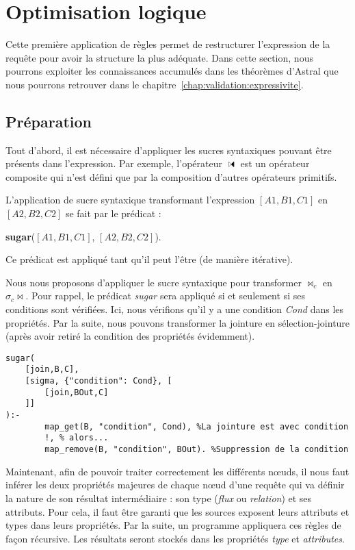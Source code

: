 \section{Optimisation logique}\label{sec:contrib:astronef:logique}
Cette première application de règles permet de restructurer l'expression de la requête pour avoir la structure la plus adéquate. Dans cette section, nous pourrons exploiter les connaissances accumulés dans les théorèmes d'Astral que nous pourrons retrouver dans le chapitre~\ref{chap:validation:expressivite}.
\subsection{Préparation}
Tout d'abord, il est nécessaire d'appliquer les sucres syntaxiques pouvant être présents dans l'expression. Par exemple, l'opérateur $\ssjoin$ est un opérateur composite qui n'est défini que par la composition d'autres opérateurs primitifs.

\begin{regle}
L'application de sucre syntaxique transformant l'expression $[A1,B1,C1]$ en $[A2,B2,C2]$ se fait par le prédicat :
\begin{center} \textbf{sugar}($[A1,B1,C1]$, $[A2,B2,C2]$).\end{center}
Ce prédicat est appliqué tant qu'il peut l'être (de manière itérative).
\end{regle}

\begin{example}
	Nous nous proposons d'appliquer le sucre syntaxique pour transformer $\Join_c$ en $\sigma_c \Join$. Pour rappel, le prédicat \textit{sugar} sera appliqué si et seulement si ses conditions sont vérifiées. Ici, nous vérifions qu'il y a une condition \textit{Cond} dans les propriétés. Par la suite, nous pouvons transformer la jointure en sélection-jointure (après avoir retiré la condition des propriétés évidemment).
	\begin{lstlisting}
sugar(
	[join,B,C], 
	[sigma, {"condition": Cond}, [
		[join,BOut,C]
	]]
):-
    	map_get(B, "condition", Cond), %La jointure est avec condition
    	!, % alors...
    	map_remove(B, "condition", BOut). %Suppression de la condition
	\end{lstlisting}
\end{example}

Maintenant, afin de pouvoir traiter correctement les différents nœuds, il nous faut inférer les deux propriétés majeures de chaque nœud d'une requête qui va définir la nature de son résultat intermédiaire : son type (\textit{flux} ou \textit{relation}) et ses attributs. Pour cela, il faut être garanti que les sources exposent leurs attributs et types dans leurs propriétés. Par la suite, un programme appliquera ces règles de façon récursive. Les résultats seront stockés dans les propriétés \textit{type} et \textit{attributes}.

